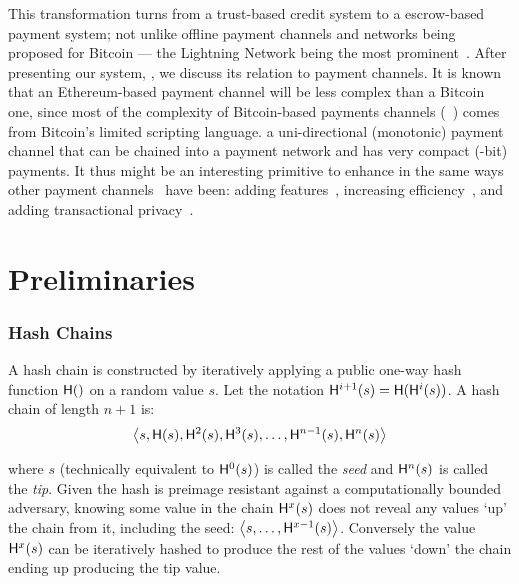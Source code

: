 This transformation turns \pw from a trust-based credit system to a escrow-based payment system; not unlike offline payment channels and networks being proposed for Bitcoin --- the Lightning Network being the most prominent~\cite{PD15}. After presenting our system, \ew, we discuss its relation to payment channels. It is known that an Ethereum-based payment channel will be less complex than a Bitcoin one, since most of the complexity of Bitcoin-based payments channels (\eg {}~\cite{MMSH16}) comes from Bitcoin's limited scripting language. \ew a uni-directional (monotonic) payment channel that can be chained into a payment network and has very compact (-bit) payments. It thus might be an interesting primitive to enhance in the same ways other payment channels~\cite{DW15,PD15} have been: adding features~\cite{KG17}, increasing efficiency~\cite{DEFM17,MBKM17}, and adding transactional privacy~\cite{GM17,MMK+17,HAB+17,RMKG18}.


\section{Preliminaries}

\subsubsection{Hash Chains}

A hash chain is constructed by iteratively applying a public one-way hash function $\mathsf{H}()$ on a random value $s$. Let the notation $\mathsf{H}^{i+1}(s) = \mathsf{H}(\mathsf{H}^{i}(s))$. A hash chain of length $n+1$ is:
\begin{equation*} \left \langle s,\mathsf{H}(s),\mathsf{H}^{2}(s),\mathsf{H}^{3}(s),\ldots,\mathsf{H}^{n-1}(s),\mathsf{H}^{n}(s) \right \rangle \end{equation*}

where $s$ (technically equivalent to $\mathsf{H}^{0}(s)$) is called the \textit{seed} and $\mathsf{H}^{n}(s)$ is called the \textit{tip}. Given the hash is preimage resistant against a computationally bounded adversary, knowing some value in the chain $\mathsf{H}^{x}(s)$ does not reveal any values `up' the chain from it, including the seed: $\left \langle s,\ldots,\mathsf{H}^{x-1}(s) \right \rangle$. Conversely the value $\mathsf{H}^{x}(s)$ can be iteratively hashed to produce the rest of the values `down' the chain ending up producing the tip value. 

